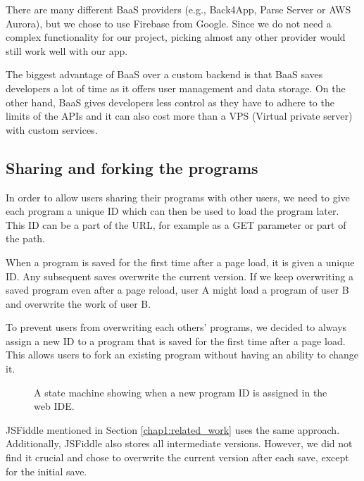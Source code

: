 There are many different BaaS providers (e.g., Back4App, Parse Server or AWS Aurora), but we chose to use Firebase \cite{Firebase} from Google. Since we do not
need a complex functionality for our project, picking almost any other provider would still work well with our app.

The biggest advantage of BaaS over a custom backend is that BaaS saves developers a lot of time as it offers user management and data storage.
On the other hand, BaaS gives developers less control as they have to adhere to the limits of the APIs and it can also cost more than a VPS (Virtual private server)
with custom services.

\subsection{Sharing and forking the programs}
\label{chap2:program_id}

In order to allow users sharing their programs with other users, we need to give each program a unique ID which can then be used to load the program later.
This ID can be a part of the URL, for example as a GET parameter or part of the path.

When a program is saved for the first time after a page load, it is given a unique ID. Any subsequent saves overwrite the current version. If we keep overwriting
a saved program even after a page reload, user A might load a program of user B and overwrite the work of user B.

To prevent users from overwriting each others' programs, we decided to always assign a new ID to a program that is saved for the first time after
a page load. This allows users to fork an existing program without having an ability to change it.

\begin{figure}[!hbt]
    \centering
	\caption{A state machine showing when a new program ID is assigned in the web IDE.}
	\label{fig:chap2:page_url}
\end{figure}

JSFiddle mentioned in Section \ref{chap1:related_work} uses the same approach. Additionally, JSFiddle also stores all intermediate versions. However,
we did not find it crucial and chose to overwrite the current version after each save, except for the initial save.
